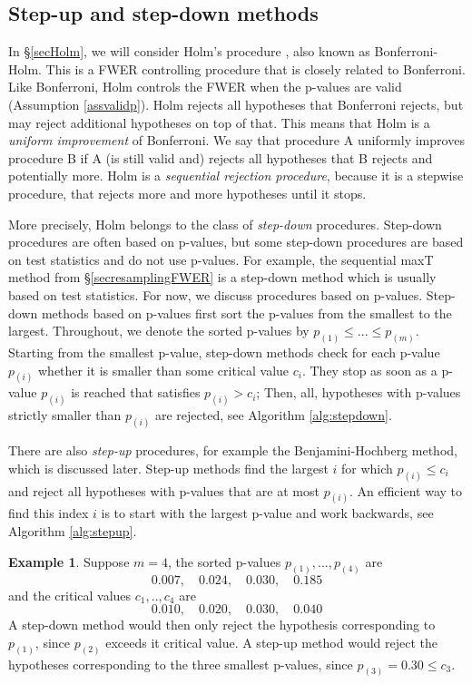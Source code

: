 \documentclass[11pt]{article}
\theoremstyle{plain}
\theoremstyle{definition}
\newtheorem{example}{Example}[section]
\newcommand{\citp}{\citep}
\begin{document}
\subsection{Step-up and step-down methods} \label{secupdown}
In \S\ref{secHolm}, we will consider 
Holm's procedure \citp{holm1979simple}, also known as Bonferroni-Holm.
This is a FWER controlling procedure that is closely related to Bonferroni. Like Bonferroni, Holm controls the FWER when the p-values are valid (Assumption \ref{assvalidp}). Holm rejects all hypotheses that Bonferroni rejects, but may reject additional hypotheses on top of that. This means that Holm is a \emph{uniform improvement} of Bonferroni. We say that procedure A uniformly improves procedure B if A (is still valid and) rejects all hypotheses that B rejects and potentially more. Holm is a \emph{sequential rejection procedure}, because it is a stepwise procedure, that rejects more and more hypotheses until it stops.  

More precisely, Holm belongs to the class of \emph{step-down} procedures. Step-down procedures are often based on p-values, but some step-down procedures are based on test statistics and do not use p-values. For example, the sequential maxT method from \S\ref{secresamplingFWER} is a step-down method which is usually based on test statistics. For now, we discuss procedures based on p-values.
 Step-down methods based on p-values first sort the  p-values from the smallest to the largest. Throughout, we denote the sorted p-values by $p_{(1)}\leq ...\leq p_{(m)}$. 
Starting from the smallest p-value, step-down methods check for each p-value $p_{(i)}$ whether it is  smaller than some critical value $c_i$.
They  stop as soon as a p-value $p_{(i)}$ is reached that satisfies $p_{(i)}>c_i$; Then, all, hypotheses with p-values strictly smaller than $p_{(i)}$ are rejected, see Algorithm \ref{alg:stepdown}.


There are also \emph{step-up} procedures, for example the Benjamini-Hochberg method, which is discussed later. Step-up methods find the largest $i$ for which $p_{(i)}\leq c_i$ and reject all hypotheses with p-values that are at most $p_{(i)}$. An efficient way to find this index $i$ is to start with the largest p-value and work backwards, see Algorithm \ref{alg:stepup}.

\begin{example}
Suppose $m=4$, the sorted p-values $p_{(1)},...,p_{(4)}$ are
$$0.007, \quad 0.024,\quad 0.030,\quad 0.185$$
and the critical values $c_1,..,c_4$ are
$$0.010, \quad 0.020,\quad 0.030,\quad 0.040$$
A step-down method would then only reject the hypothesis corresponding to $p_{(1)}$, since $p_{(2)}$ exceeds it critical value.
A step-up method would reject the hypotheses corresponding to the three smallest p-values, since $p_{(3)}=0.30\leq c_3$.
\end{example}
\end{document}

